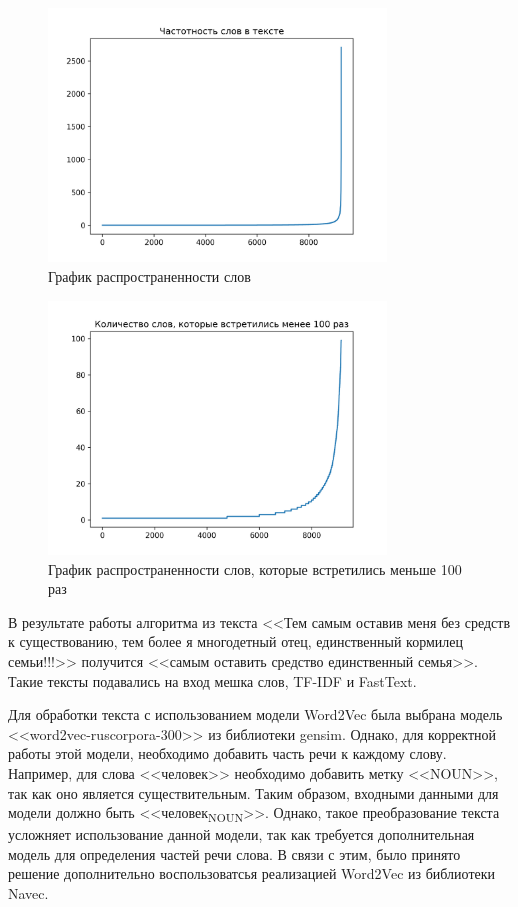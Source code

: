 \documentclass[PI, VKR]{HSEUniversity}
\begin{document}
\begin{figure}[h!]
\centering
\includegraphics[width=0.8\textwidth]{img/word_freq_total.png}
\caption{\label{fig:word_freq_total}График распространенности слов}
\end{figure}

\begin{figure}[h]
\centering
\includegraphics[width=0.8\textwidth]{img/word_freq_low.png}
\caption{\label{fig:word_freq_low}График распространенности слов, которые встретились меньше 100 раз}
\end{figure}

В результате работы алгоритма из текста {}<<Тем самым оставив меня без средств к существованию, тем более я многодетный отец, единственный кормилец семьи!!!>>{} получится {}<<самым оставить средство единственный семья>>{}. Такие тексты подавались на вход мешка слов, TF-IDF и FastText.

Для обработки текста с использованием модели Word2Vec была выбрана модель {}<<word2vec-ruscorpora-300>>{} \autocite{kutuzov_webvectors_2017} из библиотеки gensim\autocite{rehurek_software_2010}. Однако, для корректной работы этой модели, необходимо добавить часть речи к каждому слову. Например, для слова {}<<человек>>{} необходимо добавить метку {}<<NOUN>>{}, так как оно является существительным. Таким образом, входными данными для модели должно быть {}<<человек\textsubscript{NOUN}>>{}. Однако, такое преобразование текста усложняет использование данной модели, так как требуется дополнительная модель для определения частей речи слова. В связи с этим, было принято решение дополнительно воспользоватсья реализацией Word2Vec из библиотеки Navec.
\end{document}
